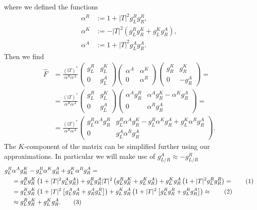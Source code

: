 \documentclass[english, parskip=full]{scrartcl}
\newcommand\numberthis{\addtocounter{equation}{1}\tag{\theequation}}
\newcommand{\kla}{}
\newcommand{\klam}{}
\renewcommand{\i}{\text{i}}
\begin{document}
where we defined the functions
\begin{align}
\alpha^R &:= 1 + |T|^2g_L^R g_R^R,\\
\alpha^K &:= -|T|^2 \kla\left( g_L^R g_R^K + g_L^K g_R^A \right),\\
\alpha^A &:= 1 + |T|^2g_L^A g_R^A.
\end{align}
Then we find
\begin{align}
\hat{F} &= \frac{(\i T)^\ast }{\alpha^R\alpha^A} \begin{pmatrix}
g_L^R & g_L^K \\ 0 & g_L^A
\end{pmatrix} \begin{pmatrix}
\alpha^A & \alpha^K \\ 0 & \alpha^R
\end{pmatrix} \begin{pmatrix}
g_R^R & g_R^K \\ 0 & -g_R^A
\end{pmatrix} = \\
&= \frac{(\i T)^\ast }{\alpha^R\alpha^A} \begin{pmatrix}
g_L^R & g_L^K \\ 0 & g_L^A
\end{pmatrix} \begin{pmatrix}
\alpha^A g_R^R & \alpha^A g_R^K - \alpha^K g_R^A \\ 0 & \alpha^R g_R^A
\end{pmatrix} = \\
&= \frac{(\i T)^\ast}{\alpha^R \alpha^A} \begin{pmatrix}
g_L^R\alpha^A g_R^R & g_L^R \alpha^A g_R^K - g_L^R \alpha^K g_R^A + g_L^K \alpha^R g_R^A \\ 
0 & g_L^A \alpha^R g_R^A
\end{pmatrix}.
\end{align}
The $K$-component of the matrix can be simplified further using our approximations.
In particular we will make use of $g_{L/R}^A \approx -g_{L/R}^{R}$
\begin{align*}
g_L^R &\alpha^A g_R^K - g_L^R \alpha^K g_R^A + g_L^K \alpha^R g_R^A = \\
&= g_L^Rg_R^K \kla\left( 1 + |T|^2 g_L^Ag_R^A \right) + g_L^R g_R^A |T|^2 \kla\left( g_L^Rg_R^K + g_L^Kg_R^A \right) + g_L^K g_R^A \kla\left( 1 + |T|^2 g_L^Rg_R^R \right) = \numberthis \\
&= g_L^Rg_R^K \kla\left( 1 + |T|^2 \klam\left[ g_L^A g_R^A + g_R^Ag_L^R \right] \right) + g_L^K g_R^A \kla\left( 1 + |T|^2 \klam\left[ g_L^R g_R^R + g_L^Rg_R^A \right] \right) \approx  \numberthis \\
&\approx g_L^R g_R^K + g_L^K g_R^A. \numberthis
\end{align*}
\end{document}
